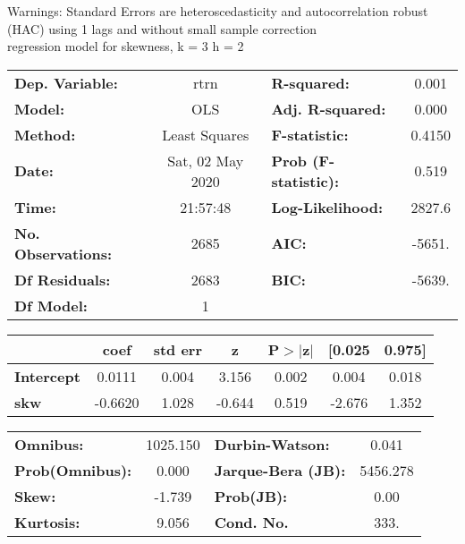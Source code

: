Warnings: \newline
 [1] Standard Errors are heteroscedasticity and autocorrelation robust (HAC) using 1 lags and without small sample correction\\ 

regression model for skewness, k = 3 h = 2\begin{center}
\begin{tabular}{lclc}
\toprule
\textbf{Dep. Variable:}    &       rtrn       & \textbf{  R-squared:         } &     0.001   \\
\textbf{Model:}            &       OLS        & \textbf{  Adj. R-squared:    } &     0.000   \\
\textbf{Method:}           &  Least Squares   & \textbf{  F-statistic:       } &    0.4150   \\
\textbf{Date:}             & Sat, 02 May 2020 & \textbf{  Prob (F-statistic):} &    0.519    \\
\textbf{Time:}             &     21:57:48     & \textbf{  Log-Likelihood:    } &    2827.6   \\
\textbf{No. Observations:} &        2685      & \textbf{  AIC:               } &    -5651.   \\
\textbf{Df Residuals:}     &        2683      & \textbf{  BIC:               } &    -5639.   \\
\textbf{Df Model:}         &           1      & \textbf{                     } &             \\
\bottomrule
\end{tabular}
\begin{tabular}{lcccccc}
                   & \textbf{coef} & \textbf{std err} & \textbf{z} & \textbf{P$> |$z$|$} & \textbf{[0.025} & \textbf{0.975]}  \\
\midrule
\textbf{Intercept} &       0.0111  &        0.004     &     3.156  &         0.002        &        0.004    &        0.018     \\
\textbf{skw}       &      -0.6620  &        1.028     &    -0.644  &         0.519        &       -2.676    &        1.352     \\
\bottomrule
\end{tabular}
\begin{tabular}{lclc}
\textbf{Omnibus:}       & 1025.150 & \textbf{  Durbin-Watson:     } &    0.041  \\
\textbf{Prob(Omnibus):} &   0.000  & \textbf{  Jarque-Bera (JB):  } & 5456.278  \\
\textbf{Skew:}          &  -1.739  & \textbf{  Prob(JB):          } &     0.00  \\
\textbf{Kurtosis:}      &   9.056  & \textbf{  Cond. No.          } &     333.  \\
\bottomrule
\end{tabular}
\end{center}

